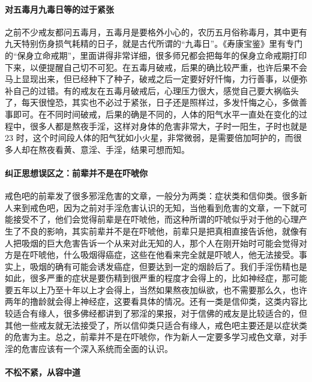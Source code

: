 \paragraph{对五毒月九毒日等的过于紧张}

之前不少戒友都问五毒月，五毒月是要格外小心的，农历五月俗称毒月，其中更有九天特别伤身损气耗精的日子，就是古代所谓的“九毒日”。《寿康宝鉴》里有专门的“保身立命戒期”，里面讲得非常详细，很多师兄都会把每年的保身立命戒期打印下来，以便提醒自己切不可犯。在五毒月破戒，后果的确比较严重，也许后果不会马上显现出来，但已经种下了种子，破戒之后一定要好好忏悔，力行善事，以便弥补自己的过错。有的戒友在五毒月破戒后，心理压力很大，感觉自己要大祸临头了，每天很惶恐，其实也不必过于紧张，日子还是照样过，多发忏悔之心，多做善事即可。在不同时间破戒，后果的确是不同的，人体的阳气水平一直处在变化的过程中，很多人都是熬夜手淫，这样对身体的危害非常大，子时一阳生，子时也就是 23 时，这个时间段人体的阳气犹如小火星，非常微弱，是需要倍加呵护的，而很多人却在熬夜看黄、意淫、手淫，结果可想而知。

\paragraph{纠正思想误区之：前辈并不是在吓唬你}

戒色吧的前辈发了很多邪淫危害的文章，一般分为两类：症状类和信仰类。很多新人来到戒色吧，因为之前对手淫危害认识的无知，当他看到危害的文章，一下就可能接受不了，他们会觉得前辈是在吓唬他，而这种所谓的吓唬似乎对于他的心理产生了不良的影响，其实前辈并不是在吓唬他，前辈只是把真相直接告诉他，就像有人把吸烟的巨大危害告诉一个从来对此无知的人，那个人在刚开始时可能会觉得对方是在吓唬他，什么吸烟得癌症，这些在他看来完全就是吓唬人，他无法接受。事实上，吸烟的确有可能会诱发癌症，但要达到一定的烟龄后了。我们手淫伤精也是如此，很多严重的症状是要伤精到很严重的程度才会得上的，比如神经症，那可能要五年以上乃至十年以上才会得上，当然如果熬夜加纵欲，也不需要那么久，也许两年的撸龄就会得上神经症，这要看具体的情况。还有一类是信仰类，这类内容比较适合有缘人，很多佛经都讲到了邪淫的果报，对于信佛的戒友是比较适合的，但其他一些戒友就无法接受了，所以信仰类只适合有缘人，戒色吧主要还是以症状类的危害为主。总之，前辈并不是在吓唬你，作为新人一定要多学习戒色文章，对手淫的危害应该有一个深入系统而全面的认识。

\paragraph{不松不紧，从容中道}

